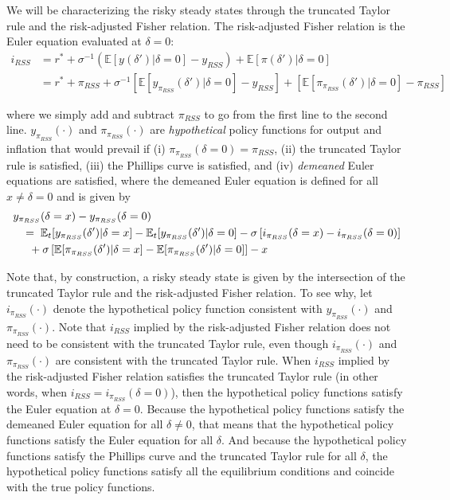 \documentclass[11pt]{article}
\begin{document}
	We will be characterizing the risky steady states through the truncated Taylor rule and the risk-adjusted Fisher relation. The risk-adjusted Fisher relation is the Euler equation evaluated at $\delta=0$:
	\begin{align}
	i_{RSS} &= r^* + \sigma^{-1}\left(\mathbb{E}[y(\delta')|\delta=0] - y_{RSS}\right) + \mathbb{E}[\pi(\delta')|\delta=0]\nonumber \\
	&= r^* + \pi_{RSS} + \sigma^{-1}\left[\mathbb{E}[y_{\pi_{RSS}}(\delta')|\delta=0] - y_{RSS}\right] +\left[\mathbb{E}[\pi_{\pi_{RSS}}(\delta')|\delta=0] - \pi_{RSS}\right]\label{eq:RAFR}
	\end{align}
	
	\noindent where we simply add and subtract $\pi_{RSS}$ to go from the first line to the second line. $y_{\pi_{RSS}}(\cdot)$ and $\pi_{\pi_{RSS}}(\cdot)$ are \textit{hypothetical} policy functions for output and inflation that would prevail if (i) $\pi_{\pi_{RSS}}(\delta=0)=\pi_{RSS}$, (ii) the truncated Taylor rule is satisfied, (iii) the Phillips curve is satisfied,  and (iv) \textit{demeaned} Euler equations are satisfied, where the demeaned Euler equation is defined for all $x \ne \delta = 0$ and is given by 
	\begin{align}
	& y_{\pi_{RSS}}(\delta=x)-y_{\pi_{RSS}}(\delta=0) \nonumber\\
	& \hspace{0.3cm} = \hspace{0.1cm}\mathbb{E}_t[y_{\pi_{RSS}}(\delta')|\delta=x] - \mathbb{E}_t[y_{\pi_{RSS}}(\delta')|\delta=0] -\sigma\left[i_{\pi_{RSS}}(\delta=x) - i_{\pi_{RSS}}(\delta=0)\right]\nonumber\\
	& \hspace{0.5cm}+ \sigma\left[\mathbb{E}[\pi_{\pi_{RSS}}(\delta')|\delta=x]-\mathbb{E}[\pi_{\pi_{RSS}}(\delta')|\delta=0]\right]-x \label{eq:dEE}
	\end{align}
	
	Note that, by construction, a risky steady state is given by the intersection of the truncated Taylor rule and the risk-adjusted Fisher relation. To see why, let $i_{\pi_{RSS}}(\cdot)$ denote the hypothetical policy function consistent with $y_{\pi_{RSS}}(\cdot)$ and $\pi_{\pi_{RSS}}(\cdot)$. Note that $i_{RSS}$ implied by the risk-adjusted Fisher relation does not need to be consistent with the truncated Taylor rule, even though $i_{\pi_{RSS}}(\cdot)$ and $\pi_{\pi_{RSS}}(\cdot)$ are consistent with the truncated Taylor rule. When  $i_{RSS}$ implied by the risk-adjusted Fisher relation satisfies the truncated Taylor rule (in other words, when $i_{RSS} = i_{\pi_{RSS}}(\delta=0)$), then the hypothetical policy functions satisfy the Euler equation at $\delta=0$. Because the hypothetical policy functions satisfy the demeaned Euler equation for all $\delta\ne 0$, that means that the hypothetical policy functions satisfy the Euler equation for all $\delta$. And because the hypothetical policy functions satisfy the Phillips curve and the truncated Taylor rule for all $\delta$, the hypothetical policy functions satisfy all the equilibrium conditions and coincide with the true policy functions. 
	
\end{document}
